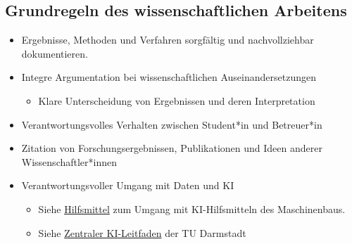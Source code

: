 \subsection*{Grundregeln des wissenschaftlichen Arbeitens}
\begin{itemize}
    \item Ergebnisse, Methoden und Verfahren sorgfältig und nachvollziehbar dokumentieren.
    \item Integre Argumentation bei wissenschaftlichen Auseinandersetzungen
    \begin{itemize}
        \item Klare Unterscheidung von Ergebnissen und deren Interpretation
    \end{itemize}
    \item Verantwortungsvolles Verhalten zwischen Student*in und Betreuer*in
    \item Zitation von Forschungsergebnissen, Publikationen und Ideen anderer Wissenschaftler*innen
    \item Verantwortungsvoller Umgang mit Daten und KI
    \begin{itemize}
        \item Siehe \href{https://www.maschinenbau.tu-darmstadt.de/media/maschinenbau/dokumente_2/studieren_1/thesis/2025-06-20_KI-Leitlinien_FB_MB.de.pdf}{Hilfsmittel} zum Umgang mit KI-Hilfsmitteln des Maschinenbaus.
        \item Siehe \href{https://www.hda.tu-darmstadt.de/hochschuldidaktik/infoseiten_hd/handreichung_ki_hd/handreichung_ki_verteilerseite.de.jsp}{Zentraler KI-Leitfaden} der TU Darmstadt
    \end{itemize}
\end{itemize}
